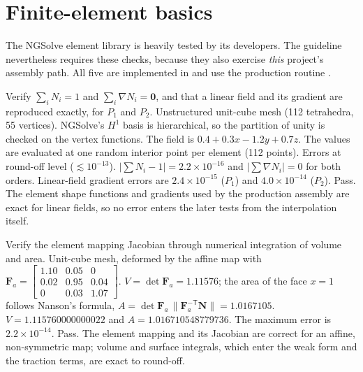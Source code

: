 \section{Finite-element basics}\label{sec:v0}

The NGSolve element library is heavily tested by its developers. The guideline
nevertheless requires these checks, because they also exercise \emph{this}
project's assembly path. All five are implemented in
 and use the production routine
.

\taim Verify $\sum_iN_i=1$ and $\sum_i\nabla N_i=\bm 0$, and that a linear field
and its gradient are reproduced exactly, for $P_1$ and $P_2$.
\tsetup Unstructured unit-cube mesh (112 tetrahedra, 55 vertices). NGSolve's $H^1$
basis is hierarchical, so the partition of unity is checked on the vertex
functions. The field is $0.4+0.3x-1.2y+0.7z$. The values are evaluated at one random interior point
per element (112 points).
\trun {}
\texpect Errors at round-off level ($\lesssim10^{-13}$).
\tobtain $|\sum N_i-1|=2.2\times10^{-16}$ and $|\sum\nabla N_i|=0$ for both orders.
Linear-field gradient errors are $2.4\times10^{-15}$ ($P_1$) and $4.0\times10^{-14}$
($P_2$). Pass.
\tinfer The element shape functions and gradients used by the production assembly are exact for linear fields, so no error enters the later tests from the interpolation itself.

\taim Verify the element mapping Jacobian through numerical integration of
volume and area.
\tsetup Unit-cube mesh, deformed by the affine map with
$\bm F_a=\begin{bmatrix}1.10&0.05&0\\0.02&0.95&0.04\\0&0.03&1.07\end{bmatrix}$.
\texpect $V=\det\bm F_a=1.11576$; the area of the face $x=1$ follows Nanson's
formula, $A=\det\bm F_a\,\|\bm F_a^{-\mathsf T}\bm N\|=1.0167105$.
\tobtain $V=1.115760000000022$ and $A=1.016710548779736$. The maximum error is
$2.2\times10^{-14}$. Pass.
\tinfer The element mapping and its Jacobian are correct for an affine, non-symmetric map; volume and surface integrals, which enter the weak form and the traction terms, are exact to round-off.

